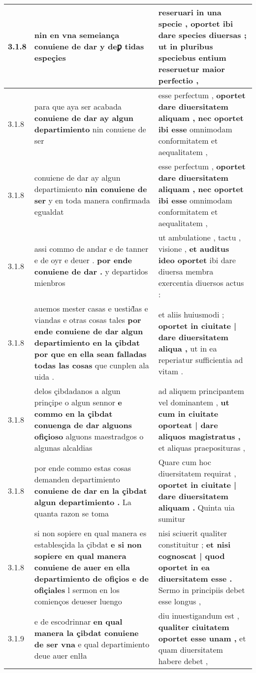 \begin{tabular}{|p{1cm}|p{6.5cm}|p{6.5cm}|}
3.1.8 & nin en vna semeiança \textbf{ conuiene de dar } y deꝑ tidas espeçies & reseruari in una specie , \textbf{ oportet ibi dare species diuersas ; } ut in pluribus speciebus entium reseruetur maior perfectio , \\\hline
3.1.8 & para que aya ser acabada \textbf{ conuiene de dar ay algun departimiento } nin conuiene de ser & esse perfectum , \textbf{ oportet dare diuersitatem aliquam , nec oportet ibi esse } omnimodam conformitatem et aequalitatem , \\\hline
3.1.8 & conuiene de dar ay algun departimiento \textbf{ nin conuiene de ser } y en toda manera confirmada egualdat & esse perfectum , \textbf{ oportet dare diuersitatem aliquam , nec oportet ibi esse } omnimodam conformitatem et aequalitatem , \\\hline
3.1.8 & assi commo de andar e de tanner e de oyr e deuer . \textbf{ por ende conuiene de dar . } y departidos mienbros & ut ambulatione , tactu , visione , \textbf{ et auditus ideo oportet } ibi dare diuersa membra exercentia diuersos actus : \\\hline
3.1.8 & auemos mester casas e uestid̃as e viandas e otras cosas tales \textbf{ por ende conuiene de dar algun departimiento en la çibdat por que en ella sean falladas todas las cosas } que cunplen ala uida . & et aliis huiusmodi ; \textbf{ oportet in ciuitate | dare diuersitatem aliqua , } ut in ea reperiatur sufficientia ad vitam . \\\hline
3.1.8 & delos çibdadanos a algun prinçipe o algun sennor \textbf{ e commo en la çibdat conuenga de dar alguons ofiçioso } alguons maestradgos o algunas alcaldias & ad aliquem principantem vel dominantem , \textbf{ ut cum in ciuitate oporteat | dare aliquos magistratus , } et aliquas praeposituras , \\\hline
3.1.8 & por ende commo estas cosas demanden departimiento \textbf{ conuiene de dar en la çibdat algun departimiento . } La quanta razon se toma & Quare cum hoc diuersitatem requirat , \textbf{ oportet in ciuitate | dare diuersitatem aliquam . } Quinta uia sumitur \\\hline
3.1.8 & si non sopiere en qual manera es establesçida la çibdat \textbf{ e si non sopiere en qual manera conuiene de auer en ella departimiento de ofiçios e de ofiçiales } l sermon en los comienços deueser luengo & nisi sciuerit qualiter constituitur ; \textbf{ et nisi cognoscat | quod oportet in ea diuersitatem esse . } Sermo in principiis debet esse longus , \\\hline
3.1.9 & e de escodrinnar \textbf{ en qual manera la çibdat conuiene de ser vna } e qual departimiento deue auer enlła & diu inuestigandum est , \textbf{ qualiter ciuitatem oportet esse unam , } et quam diuersitatem habere debet , \\\hline

\end{tabular}
